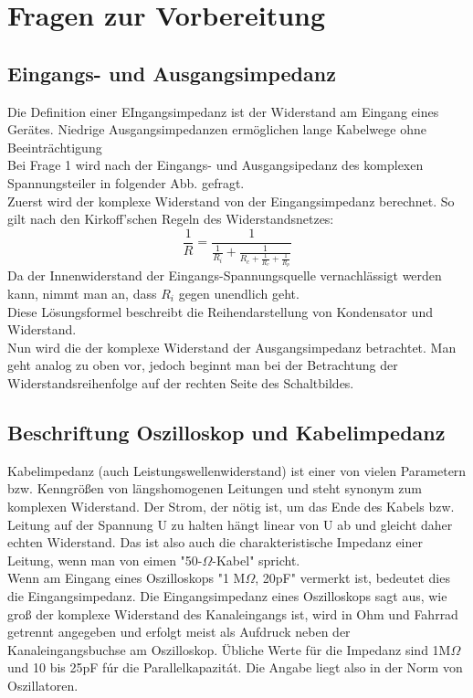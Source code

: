 

\chapter{Fragen zur Vorbereitung}
\label{chap:fvz}
\section{Eingangs- und Ausgangsimpedanz}
Die Definition einer EIngangsimpedanz ist der Widerstand am Eingang eines Gerätes. Niedrige Ausgangsimpedanzen ermöglichen lange Kabelwege ohne Beeinträchtigung\\
Bei Frage 1 wird nach der Eingangs- und Ausgangsipedanz des komplexen Spannungsteiler in folgender Abb. gefragt. \\
Zuerst wird der komplexe Widerstand von der Eingangsimpedanz berechnet. So gilt nach den Kirkoff'schen Regeln des Widerstandsnetzes:
\begin{equation}
    \frac{1}{R}=\frac{1}{\frac{1}{R_i}+\frac{1}{R_c+{\frac{1}{R_v}+\frac{1}{R_p}}}}
\end{equation}
Da der Innenwiderstand der Eingangs-Spannungsquelle vernachl\"assigt werden kann, nimmt man an, dass $R_i$ gegen unendlich geht.\\
Diese L\"osungsformel beschreibt die Reihendarstellung von Kondensator und Widerstand. \\

Nun wird die der komplexe Widerstand der Ausgangsimpedanz betrachtet. Man geht analog zu oben vor, jedoch beginnt man bei der Betrachtung der Widerstandsreihenfolge auf der rechten Seite des Schaltbildes. 

\section{Beschriftung Oszilloskop und Kabelimpedanz}
Kabelimpedanz (auch Leistungswellenwiderstand) ist einer von vielen Parametern bzw.
Kenngrößen von längshomogenen Leitungen und steht synonym zum komplexen Widerstand.
Der Strom, der n\"otig ist, um das Ende des Kabels bzw. Leitung auf der Spannung U zu halten h\"angt linear von U ab und gleicht daher echten Widerstand. Das ist also auch die charakteristische Impedanz einer Leitung, wenn man von eimen "50-$\Omega$-Kabel" spricht.\\
Wenn am Eingang eines Oszilloskops "1 M$\Omega$, 20pF" vermerkt ist, bedeutet dies die Eingangsimpedanz. Die Eingangsimpedanz eines Oszilloskops sagt aus, wie gro\ss{} der komplexe Widerstand des Kanaleingangs ist, wird in Ohm und Fahrrad getrennt angegeben und erfolgt meist als Aufdruck neben der Kanaleingangsbuchse am Oszilloskop. \"Ubliche Werte f\"ur die Impedanz sind 1M$\Omega$ und 10 bis 25pF f\'ur die Parallelkapazit\'at. Die Angabe liegt also in der Norm von Oszillatoren. 

